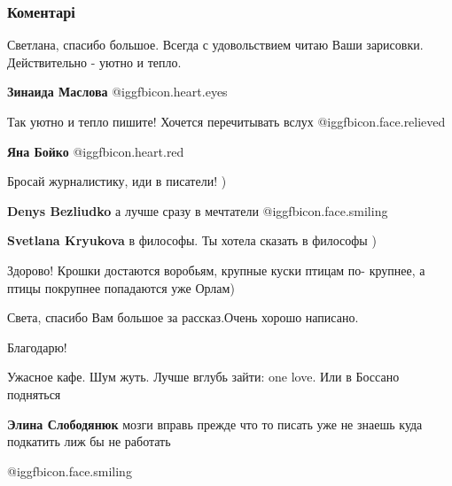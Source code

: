  
 
 
 
 
\subsubsection{Коментарі}

\begin{itemize} %

Светлана, спасибо большое. Всегда с удовольствием читаю Ваши зарисовки. Действительно - уютно и тепло.

\textbf{Зинаида Маслова}  @igg{fbicon.heart.eyes} 

Так уютно и тепло пишите! Хочется перечитывать вслух  @igg{fbicon.face.relieved} 

\textbf{Яна Бойко}  @igg{fbicon.heart.red}

Бросай журналистику, иди в писатели! )

\begin{itemize} %
\textbf{Denys Bezliudko} а лучше сразу в мечтатели 	@igg{fbicon.face.smiling}

\textbf{Svetlana Kryukova} в философы. Ты хотела сказать в философы )
\end{itemize} %

Здорово!
Крошки достаются воробьям, крупные куски птицам по- крупнее, а птицы покрупнее попадаются уже Орлам)

Света, спасибо Вам большое за рассказ.Очень хорошо написано.

Благодарю!

Ужасное кафе. Шум жуть. Лучше вглубь зайти: one love. Или в Боссано подняться

\begin{itemize} %
\textbf{Элина Слободянюк} мозги вправь прежде что то писать уже не знаешь куда подкатить лиж бы не работать
\end{itemize} %

@igg{fbicon.face.smiling}


\end{itemize}
